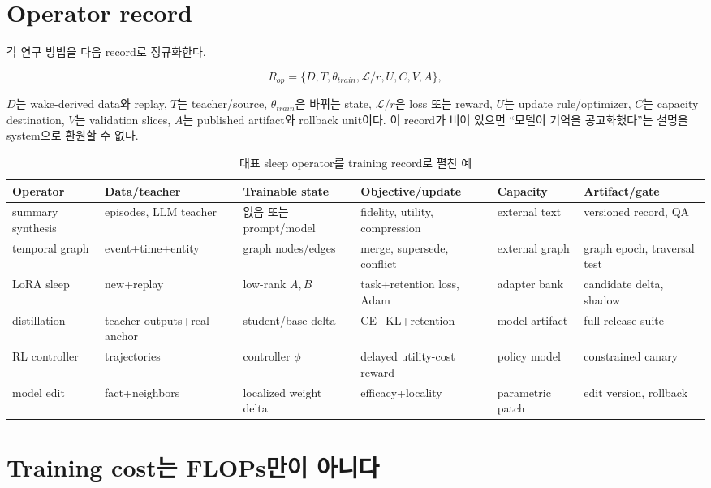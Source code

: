 \section{Operator record}

각 연구 방법을 다음 record로 정규화한다.

\begin{equation}
R_{op}=\{D, T, \theta_{train}, \mathcal{L}/r, U, C, V, A\},
\end{equation}

$D$는 wake-derived data와 replay, $T$는 teacher/source, $\theta_{train}$은 바뀌는 state,
$\mathcal{L}/r$은 loss 또는 reward, $U$는 update rule/optimizer, $C$는 capacity destination,
$V$는 validation slices, $A$는 published artifact와 rollback unit이다. 이 record가 비어 있으면
``모델이 기억을 공고화했다''는 설명을 system으로 환원할 수 없다.

\begin{table}[htbp]
\centering
\caption{대표 sleep operator를 training record로 펼친 예}
\label{tab:study-operator-record}
\scriptsize
\begin{tabularx}{\textwidth}{p{} p{} p{} p{} X X}
\toprule
Operator & Data/teacher & Trainable state & Objective/update & Capacity & Artifact/gate \\
\midrule
summary synthesis & episodes, LLM teacher & 없음 또는 prompt/model & fidelity, utility, compression & external text & versioned record, QA \\
temporal graph & event+time+entity & graph nodes/edges & merge, supersede, conflict & external graph & graph epoch, traversal test \\
LoRA sleep & new+replay & low-rank $A,B$ & task+retention loss, Adam & adapter bank & candidate delta, shadow \\
distillation & teacher outputs+real anchor & student/base delta & CE+KL+retention & model artifact & full release suite \\
RL controller & trajectories & controller $\phi$ & delayed utility-cost reward & policy model & constrained canary \\
model edit & fact+neighbors & localized weight delta & efficacy+locality & parametric patch & edit version, rollback \\
\bottomrule
\end{tabularx}
\end{table}

\section{Training cost는 FLOPs만이 아니다}

